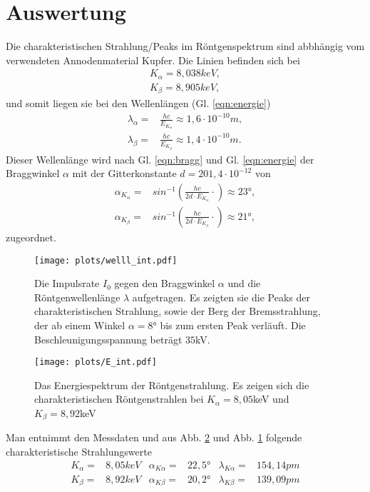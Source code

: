 \newpage
\section{Auswertung}
Die charakteristischen Strahlung/Peaks im Röntgenspektrum sind abbhängig vom 
verwendeten Annodenmaterial Kupfer. Die Linien befinden sich bei \cite{literatur}
\begin{align*}
    K_{\alpha}=8,038\si{keV},\\
    K_{\beta}=8,905\si{keV},
\end{align*}
und somit liegen sie bei den Wellenlängen (Gl. \ref{eqn:energie})
\begin{align*}
    \lambda_{\alpha} =& \frac{hc}{E_{K_{\alpha}}}\approx 1,6\cdot 10^{-10}\si{m},\\
    \lambda_{\beta}  =& \frac{hc}{E_{K_{\beta}}}\approx 1,4 \cdot 10^{-10}\si{m} .
\end{align*}
Dieser Wellenlänge wird nach Gl. \ref{eqn:bragg} und Gl. \ref{eqn:energie} der Braggwinkel $\alpha$ 
mit der Gitterkonstante $d=201,4\cdot 10^{-12}$ von
\begin{align*}
    \alpha_{K_{\alpha}}=&sin^{-1}\left(\frac{hc}{2d \cdot E_{K_{\alpha}}}\cdot\right)\approx 23°,\\
    \alpha_{K_{\beta}}=&sin^{-1}\left(\frac{hc}{2d \cdot E_{K_{\beta}}}\cdot\right)\approx 21°,
\end{align*}
zugeordnet.

\begin{figure}[H]
    \centering
    \texttt{[image: plots/welll\_int.pdf]}
    \caption{Die Impulsrate $I_0$ gegen den Braggwinkel $\alpha$ und die 
    Röntgenwellenlänge $\lambda$ aufgetragen. Es zeigten sie die Peaks der 
    charakteristischen Strahlung, sowie der Berg der Bremsstrahlung, der ab einem 
    Winkel $\alpha=8°$ bis zum ersten Peak verläuft. Die Beschleunigungsspannung 
    beträgt $35$kV.}
    \label{fig:braggw}
\end{figure}

\begin{figure}[H]
    \centering
    \texttt{[image: plots/E\_int.pdf]}
    \caption{Das Energiespektrum der Röntgenstrahlung. Es zeigen sich
    die charakteristischen Röntgenstrahlen bei $K_{\alpha}=8,05$keV und 
    $K_{\beta}=8,92$keV}
    \label{fig:energie}
\end{figure}


Man entnimmt den Messdaten und aus Abb. \ref{fig:energie} und Abb. \ref{fig:braggw} 
folgende charakteristische Strahlungswerte
\begin{align*}
    K_{\alpha}=&8,05keV &\alpha_{K\alpha}=&22,5°& \lambda_{K\alpha}=&154,14\si{pm}\\ 
    K_{\beta}=&8,92keV &\alpha_{K\beta}=&20,2° &\lambda_{K\beta}=&139,09\si{pm}\\
\end{align*}



